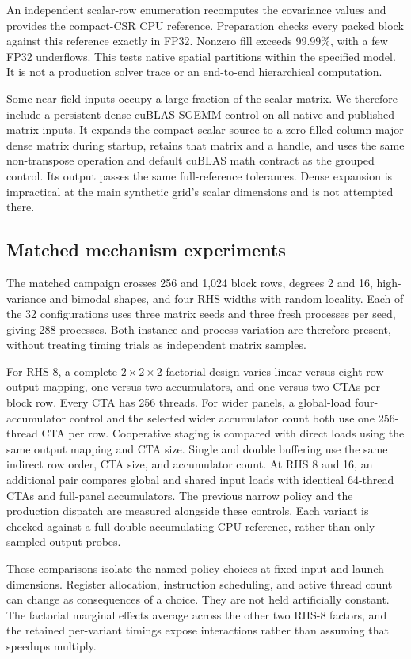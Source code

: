 \documentclass[10pt]{article}
\begin{document}
An independent scalar-row enumeration recomputes the covariance values
and provides the compact-CSR CPU reference. Preparation checks every
packed block against this reference exactly in FP32. Nonzero fill exceeds
99.99\%, with a few FP32 underflows. This tests native spatial partitions
within the specified model. It is
not a production solver trace or an end-to-end hierarchical computation.

Some near-field inputs occupy a large fraction of the scalar matrix.
We therefore include a persistent dense cuBLAS SGEMM control on all
native and published-matrix inputs. It expands the compact scalar source
to a zero-filled column-major dense matrix during startup, retains that
matrix and a handle, and uses the same non-transpose operation and
default cuBLAS math contract as the grouped control. Its output passes
the same full-reference tolerances. Dense expansion is impractical at
the main synthetic grid's scalar dimensions and is not attempted there.

\subsection{Matched mechanism experiments}
The matched campaign crosses 256 and 1,024 block rows, degrees 2 and 16,
high-variance and bimodal shapes, and four RHS widths with random locality.
Each of the 32 configurations uses three matrix seeds and three fresh
processes per seed, giving 288 processes. Both instance and process
variation are therefore present, without treating timing trials as
independent matrix samples.

For RHS 8, a complete \(2\times2\times2\) factorial design varies
linear versus eight-row output mapping, one versus two accumulators, and
one versus two CTAs per block row. Every CTA has 256 threads. For wider
panels, a global-load four-accumulator control and the selected wider
accumulator count both use one 256-thread CTA per row. Cooperative staging
is compared with direct loads using the same output mapping and CTA size.
Single and double buffering use the same indirect row order, CTA size,
and accumulator count. At RHS 8 and 16, an additional pair compares global and shared input
loads with identical 64-thread CTAs and full-panel accumulators. The previous
narrow policy and the production dispatch are measured alongside these
controls. Each variant is checked against a full double-accumulating
CPU reference, rather than only sampled output probes.

These comparisons isolate the named policy choices at fixed input and
launch dimensions. Register allocation, instruction scheduling, and active
thread count can change as consequences of a choice. They are not held
artificially constant. The factorial marginal effects average across
the other two RHS-8 factors, and the retained per-variant timings expose
interactions rather than assuming that speedups multiply.
\end{document}
